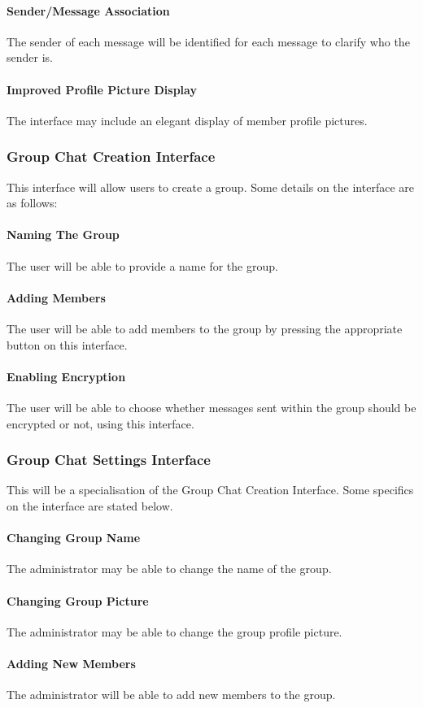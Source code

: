 \documentclass[11pt]{article}
\begin{document}
\paragraph{Sender/Message Association} The sender of each message will be identified for each message to clarify who the sender is.
\paragraph{Improved Profile Picture Display} The interface may include an elegant display of member profile pictures.
\subsubsection{Group Chat Creation Interface} This interface will allow users to create a group. Some details on the interface are as follows:
\paragraph{Naming The Group} The user will be able to provide a name for the group.
\paragraph{Adding Members} The user will be able to add members to the group by pressing the appropriate button on this interface.
\paragraph{Enabling Encryption} The user will be able to choose whether messages sent within the group should be encrypted or not, using this interface.
\subsubsection{Group Chat Settings Interface} This will be a specialisation of the Group Chat Creation Interface. Some specifics on the interface are stated below.
\paragraph{Changing Group Name} The administrator may be able to change the name of the group.
\paragraph{Changing Group Picture} The administrator may be able to change the group profile picture.
\paragraph{Adding New Members} The administrator will be able to add new members to the group.
\end{document}
